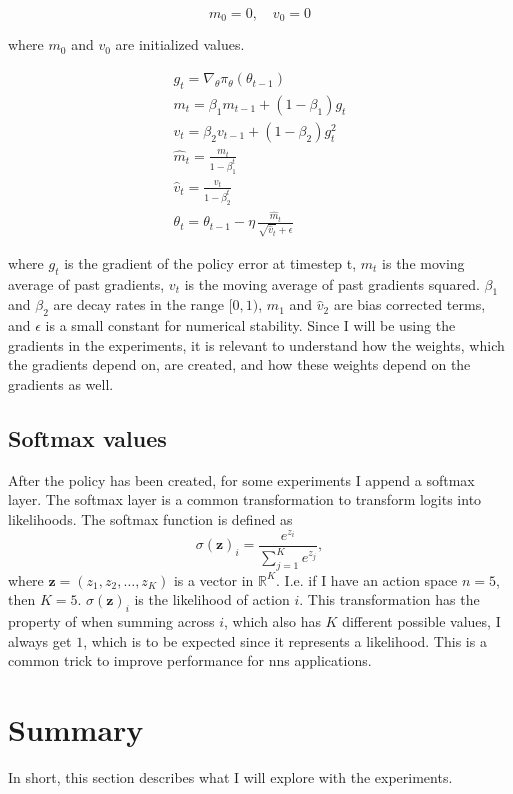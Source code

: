 \documentclass[UKenglish]{uiomasterthesis}
\begin{document}
\[
m_0 = 0, \quad v_0 = 0
\]

where $m_0$ and $v_0$ are initialized values.

\begin{equation*}
\begin{gathered}
  g_t = \nabla_{\theta} \pi_\theta(\theta_{t-1}) \\
  m_t = \beta_1 m_{t-1} + (1 - \beta_1) g_t \\
  v_t = \beta_2 v_{t-1} + (1 - \beta_2) g_t^2 \\
  \hat{m}_t = \frac{m_t}{1 - \beta_1^t} \\
  \hat{v}_t = \frac{v_t}{1 - \beta_2^t} \\
  \theta_t = \theta_{t-1} - \eta \, \frac{\hat{m}_t}{\sqrt{\hat{v}_t} + \epsilon}
\end{gathered}
\end{equation*}

where $g_t$ is the gradient of the policy error at timestep t, $m_t$ is the moving average of past gradients, $v_t$ is the moving average of past gradients squared. $\beta_1$ and $\beta_2$ are decay rates in the range $[0,1)$, $\hat m_1$ and $\hat v_2$ are bias corrected terms, and $\epsilon$ is a small constant for numerical stability. Since I will be using the gradients in the experiments, it is relevant to understand how the weights, which the gradients depend on, are created, and how these weights depend on the gradients as well.

\subsection{Softmax values}
After the policy has been created, for some experiments I append a softmax layer. The softmax layer is a common transformation to transform logits into likelihoods\cite{softmax}. The softmax function is defined as
\[
\sigma(\mathbf{z})_i = \frac{e^{z_i}}{\sum_{j=1}^K e^{z_j}},
\]
where \( \mathbf{z} = (z_1, z_2, \ldots, z_K) \) is a vector in \( \mathbb{R}^K \). I.e. if I have an action space $n=5$, then $K=5$. $\sigma(\mathbf{z})_i$ is the likelihood of action $i$. This transformation has the property of when summing across $i$, which also has $K$ different possible values, I always get $1$, which is to be expected since it represents a likelihood. This is a common trick to improve performance for \acp{nn} applications.

\section{Summary}
In short, this section describes what I will explore with the experiments.
\end{document}

